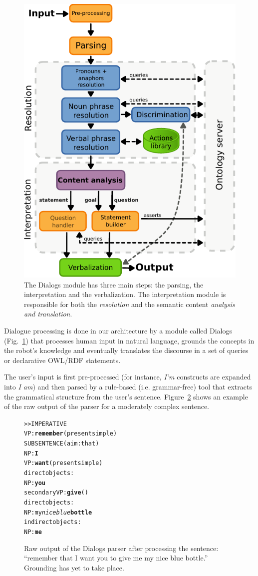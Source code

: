 \documentclass{svmult}
\newcommand{\ie}{i.e.\xspace}
\begin{document}
\begin{figure}[!t]
\centering
  \includegraphics[width=0.5\linewidth]{figs/dialog_module_simple.pdf}
  \caption{The {\sc Dialogs} module has three main steps: the parsing,
  the interpretation and the verbalization. The interpretation module is
  responsible for both the \emph{resolution} and the semantic content
  \emph{analysis and translation}.} 
  \label{fig|dialog}
\end{figure}

Dialogue processing is done in our architecture by a module called {\sc
Dialogs}\cite{Lemaignan2011a} (Fig.~\ref{fig|dialog}) that processes human
input in natural language, grounds the concepts in the robot's knowledge and
eventually translates the discourse in a set of queries or declarative OWL/RDF
statements.  

The user's input is first pre-processed (for instance, \emph{I'm} constructs
are expanded into \emph{I am}) and then parsed by a rule-based (\ie
grammar-free) tool that extracts the grammatical structure from the user's
sentence. Figure~\ref{dialog|parser_output} shows an example of the raw output
of the parser for a moderately complex sentence.

\begin{figure}%
\begin{center}
\scriptsize
\begin{alltt}
>> IMPERATIVE
VP: \textbf{remember} (present simple)
    SUBSENTENCE (aim: that)
      NP: \textbf{I}
      VP: \textbf{want} (present simple)
        direct objects: 
          NP: \textbf{you}
        secondary VP: \textbf{give} ()
              direct objects:
                NP: my \emph{nice blue} \textbf{bottle}
              indirect objects:
                NP: \textbf{me}
\end{alltt}
\end{center}
\caption{Raw output of the {\sc Dialogs} parser after processing the
sentence: ``remember that I want you to give me my nice blue bottle.'' 
Grounding has yet to take place.} 
\label{dialog|parser_output}
\end{figure}
\end{document}

